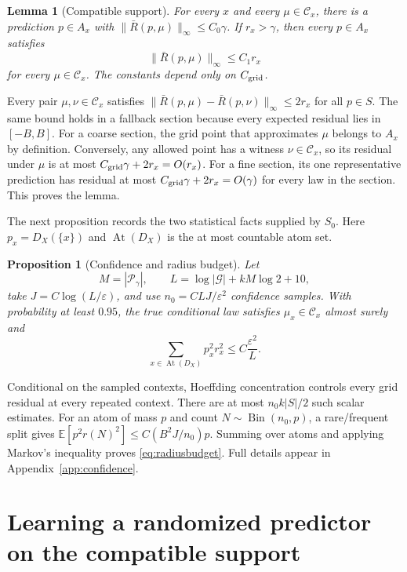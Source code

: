 \documentclass{article}
\newtheorem{lemma}[theorem]{Lemma}
\newtheorem{proposition}[theorem]{Proposition}
\theoremstyle{definition}
\theoremstyle{remark}
\newcommand{\E}{\mathbb E}
\newcommand{\1}{\mathbf 1}
\newcommand{\cG}{\mathcal G}
\newcommand{\cP}{\mathcal P}
\newcommand{\cC}{\mathcal C}
\newcommand{\At}{\operatorname{At}}
\begin{document}
\begin{lemma}[Compatible support]\label{lem:support}
For every $x$ and every $\mu\in\cC_x$, there is a prediction $p\in A_x$ with $\|\bar R(p,\mu)\|_\infty\le C_0\gamma$. If $r_x>\gamma$, then every $p\in A_x$ satisfies \[ \|\bar R(p,\mu)\|_\infty\le C_1r_x \] for every $\mu\in\cC_x$. The constants depend only on $C_{\rm grid}$.
\end{lemma}

Every pair $\mu,\nu\in\cC_x$ satisfies $\|\bar R(p,\mu)-\bar R(p,\nu)\|_\infty\le2r_x$ for all $p\in S$. The same bound holds in a fallback section because every expected residual lies in $[-B,B]$. For a coarse section, the grid point that approximates $\mu$ belongs to $A_x$ by definition. Conversely, any allowed point has a witness $\nu\in\cC_x$, so its residual under $\mu$ is at most $C_{\rm grid}\gamma+2r_x=O(r_x)$. For a fine section, its one representative prediction has residual at most $C_{\rm grid}\gamma+2r_x=O(\gamma)$ for every law in the section. This proves the lemma.

The next proposition records the two statistical facts supplied by $S_0$. Here $p_x=D_X(\{x\})$ and $\At(D_X)$ is the at most countable atom set.

\begin{proposition}[Confidence and radius budget]\label{prop:confidence}
Let \[ M=|\cP_\gamma|,\qquad L=\log|\cG|+kM\log2+10, \] take $J=C\log(L/\varepsilon)$, and use $n_0=CLJ/\varepsilon^2$ confidence samples. With probability at least $0.95$, the true conditional law satisfies $\mu_x\in\cC_x$ almost surely and
\begin{equation}
\sum_{x\in\At(D_X)}p_x^2r_x^2\le C\frac{\varepsilon^2}{L}.
\label{eq:radiusbudget}
\end{equation}
\end{proposition}

Conditional on the sampled contexts, Hoeffding concentration controls every grid residual at every repeated context. There are at most $n_0k|S|/2$ such scalar estimates. For an atom of mass $p$ and count $N\sim\operatorname{Bin}(n_0,p)$, a rare/frequent split gives $\E[p^2r(N)^2]\le C(B^2J/n_0)p$. Summing over atoms and applying Markov's inequality proves \eqref{eq:radiusbudget}. Full details appear in Appendix~\ref{app:confidence}.

\section{Learning a randomized predictor on the compatible support}
\end{document}
